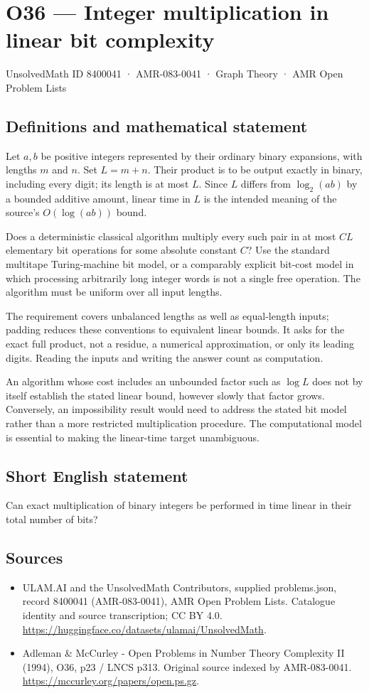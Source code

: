 \documentclass[11pt,a4paper]{article}
\begin{document}
\section*{O36 — Integer multiplication in linear bit complexity}\label{8400041}
{\small UnsolvedMath ID 8400041 · AMR-083-0041 · Graph Theory · AMR Open Problem Lists}
\subsection{Definitions and mathematical statement}
Let $a,b$ be positive integers represented by their ordinary binary expansions, with lengths $m$ and $n$. Set $L=m+n$. Their product is to be output exactly in binary, including every digit; its length is at most $L$. Since $L$ differs from $\log_2(ab)$ by a bounded additive amount, linear time in $L$ is the intended meaning of the source's $O(\log(ab))$ bound.

Does a deterministic classical algorithm multiply every such pair in at most $CL$ elementary bit operations for some absolute constant $C$? Use the standard multitape Turing-machine bit model, or a comparably explicit bit-cost model in which processing arbitrarily long integer words is not a single free operation. The algorithm must be uniform over all input lengths.

The requirement covers unbalanced lengths as well as equal-length inputs; padding reduces these conventions to equivalent linear bounds. It asks for the exact full product, not a residue, a numerical approximation, or only its leading digits. Reading the inputs and writing the answer count as computation.

An algorithm whose cost includes an unbounded factor such as $\log L$ does not by itself establish the stated linear bound, however slowly that factor grows. Conversely, an impossibility result would need to address the stated bit model rather than a more restricted multiplication procedure. The computational model is essential to making the linear-time target unambiguous.
\subsection{Short English statement}
Can exact multiplication of binary integers be performed in time linear in their total number of bits?
\subsection{Sources}
\begin{itemize}
\item[S1] ULAM.AI and the UnsolvedMath Contributors, supplied problems.json, record 8400041 (AMR-083-0041), AMR Open Problem Lists. Catalogue identity and source transcription; CC BY 4.0.
\url{https://huggingface.co/datasets/ulamai/UnsolvedMath}.
\item[S2] Adleman \& McCurley - Open Problems in Number Theory Complexity II (1994), O36, p23 / LNCS p313. Original source indexed by AMR-083-0041.
\url{https://mccurley.org/papers/open.ps.gz}.
\end{itemize}
\end{document}
